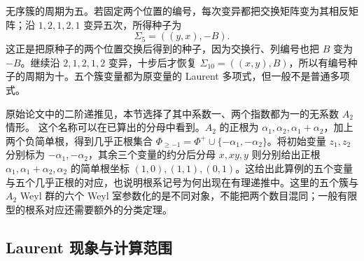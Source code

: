 \ProseParagraphBreak

无序簇的周期为五。若固定两个位置的编号，每次变异都把交换矩阵变为其相反矩阵；沿 \(1,2,1,2,1\) 变异五次，所得种子为
\[
	\Sigma_5=((y,x),-B).
\]
这正是把原种子的两个位置交换后得到的种子，因为交换行、列编号也把 \(B\) 变为 \(-B\)。继续沿 \(2,1,2,1,2\) 变异，十步后才恢复 \(\Sigma_{10}=((x,y),B)\)，所以有编号种子的周期为十。五个簇变量都为原变量的 Laurent 多项式，但一般不是普通多项式。

\ProseParagraphBreak

原始论文中的二阶递推见\cite[Example 2.5; Section 6]{FominZelevinsky2002ClusterFoundations}，本节选择了其中系数一、两个指数都为一的无系数 \(A_2\) 情形。
\ProseParagraphBreak
这个名称可以在已算出的分母中看到。\(A_2\) 的正根为 \(\alpha_1,\alpha_2,\alpha_1+\alpha_2\)，加上两个负简单根，得到几乎正根集合 \(\Phi_{\ge-1}=\Phi^+\cup\{-\alpha_1,-\alpha_2\}\)。将初始变量 \(z_1,z_2\) 分别标为 \(-\alpha_1,-\alpha_2\)，其余三个变量的约分后分母 \(x,xy,y\) 则分别给出正根 \(\alpha_1,\alpha_1+\alpha_2,\alpha_2\) 的简单根坐标 \((1,0),(1,1),(0,1)\)。这给出此算例的五个变量与五个几乎正根的对应，也说明根系记号为何出现在有理递推中。这里的五个簇与 \(A_2\) Weyl 群的六个 Weyl 室参数化的是不同对象，不能把两个数目混同；一般有限型的根系对应还需要额外的分类定理。

\subsection{Laurent 现象与计算范围}
\label{b5:subsec:B02:03}

